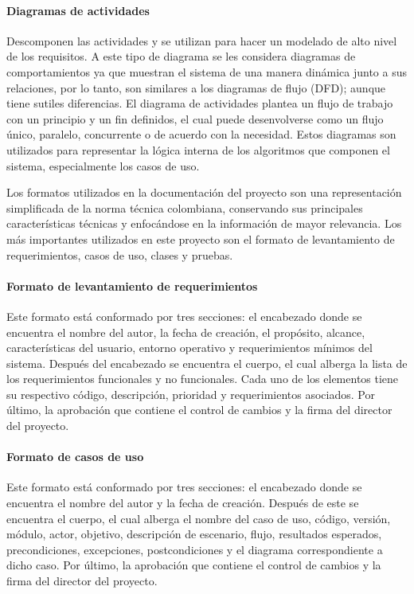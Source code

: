 \paragraph{Diagramas de actividades} Descomponen las actividades y se utilizan para hacer un modelado de alto nivel de los requisitos. A este tipo de diagrama se les considera diagramas de comportamientos ya que muestran el sistema de una manera dinámica junto a sus relaciones, por lo tanto, son similares a los diagramas de flujo (DFD); aunque tiene sutiles diferencias. El diagrama de actividades plantea un flujo de trabajo con un principio y un fin definidos, el cual puede desenvolverse como un flujo único, paralelo, concurrente o de acuerdo con la necesidad. Estos diagramas son utilizados para representar la lógica interna de los algoritmos que componen el sistema, especialmente los casos de uso.

Los formatos utilizados en la documentación del proyecto son una representación simplificada de la norma técnica colombiana, conservando sus principales características técnicas y enfocándose en la información de mayor relevancia. Los más importantes utilizados en este proyecto son el formato de levantamiento de requerimientos, casos de uso, clases y pruebas.

\paragraph{Formato de levantamiento de requerimientos} Este formato está conformado por tres secciones: el encabezado donde se encuentra el nombre del autor, la fecha de creación, el propósito, alcance, características del usuario, entorno operativo y requerimientos mínimos del sistema. Después del encabezado se encuentra el cuerpo, el cual alberga la lista de los requerimientos funcionales y no funcionales. Cada uno de los elementos tiene su respectivo código, descripción, prioridad y requerimientos asociados. Por último, la aprobación que contiene el control de cambios y la firma del director del proyecto.

\paragraph{Formato de casos de uso} Este formato está conformado por tres secciones: el encabezado donde se encuentra el nombre del autor y la fecha de creación. Después de este se encuentra el cuerpo, el cual alberga el nombre del caso de uso, código, versión, módulo, actor, objetivo, descripción de escenario, flujo, resultados esperados, precondiciones, excepciones, postcondiciones y el diagrama correspondiente a dicho caso. Por último, la aprobación que contiene el control de cambios y la firma del director del proyecto.

